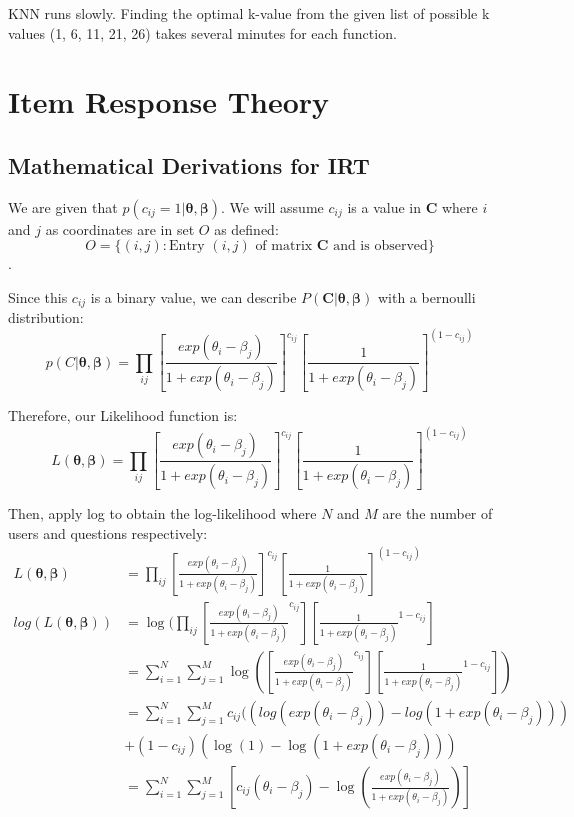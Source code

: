 \documentclass{article}
\begin{document}
    KNN runs slowly. Finding the optimal k-value from the given list of possible k values ({1, 6, 11, 21, 26}) takes several minutes for each function.

    


    \pagebreak

    \section{Item Response Theory}
    \subsection{Mathematical Derivations for IRT}
    We are given that $p(c_{ij} = 1 \vert \bm{\theta}, \bm{\beta})$. We will assume $c_{ij}$ is a value in $\bm{C}$ where $i$ and $j$ as coordinates are in set $O$ as defined:
    \[ O = \{(i,j): \text{Entry $(i,j)$ of matrix $\bm{C}$ and is observed}\} \].

    Since this $c_{ij}$ is a binary value, we can describe $P(\bm{C} \vert \bm{\theta}, \bm{\beta})$ with a bernoulli distribution:
    \[p(C \vert \bm{\theta}, \bm{\beta}) = \prod_{ij}[\frac{exp(\theta_{i} - \beta_{j})}{1+exp(\theta_{i} - \beta_{j})}]^{c_{ij}}[\frac{1}{1 + exp(\theta_{i} - \beta_{j})}]^{(1-c_{ij})}\]

    Therefore, our Likelihood function is:
    \[L(\bm{\theta}, \bm{\beta}) =\prod_{ij}[\frac{exp(\theta_{i} - \beta_{j})}{1+exp(\theta_{i} - \beta_{j})}]^{c_{ij}}[\frac{1}{1 + exp(\theta_{i} - \beta_{j})}]^{(1-c_{ij})}\]

    Then, apply log to obtain the log-likelihood where $N$ and $M$ are the number of users and questions respectively:
    \begin{align*}
        L(\bm{\theta}, \bm{\beta}) &=\prod_{ij}[\frac{exp(\theta_{i} - \beta_{j})}{1+exp(\theta_{i} - \beta_{j})}]^{c_{ij}}[\frac{1}{1 + exp(\theta_{i} - \beta_{j})}]^{(1-c_{ij})} \\
        log(L(\bm{\theta}, \bm{\beta})) &= \log(\prod_{ij}[\frac{exp(\theta_{i} - \beta_{j})}{1+exp(\theta_{i} - \beta_{j})}^{c_{ij}}][\frac{1}{1 + exp(\theta_{i} - \beta_{j})}^{1-c_{ij}}] \\
        &=\sum_{i=1}^{N} \sum_{j=1}^{M} \log([\frac{exp(\theta_{i} - \beta_{j})}{1+exp(\theta_{i} - \beta_{j})}^{c_{ij}}][\frac{1}{1 + exp(\theta_{i} - \beta_{j})}^{1-c_{ij}}]) \\
        &=\sum_{i=1}^{N} \sum_{j=1}^{M} c_{ij}((log(exp(\theta_{i} - \beta_{j})) - log(1 + exp(\theta_{i} - \beta_{j}))) \\
        &+ (1 - c_{ij})(\log(1) - \log(1 + exp(\theta_{i} - \beta_{j}))) \\
        &=\sum_{i=1}^{N} \sum_{j=1}^{M} [c_{ij}(\theta_{i} - \beta_{j}) - \log(\frac{exp(\theta_{i} - \beta_{j})}{1+exp(\theta_{i} - \beta_{j})})] \\
    \end{align*}
\end{document}

